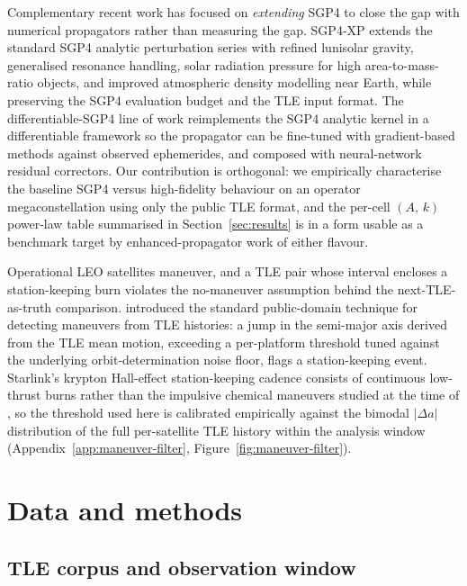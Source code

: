 \documentclass[10pt, letterpaper]{article}
\begin{document}
Complementary recent work has focused on \emph{extending} SGP4 to
close the gap with numerical propagators rather than measuring the
gap. SGP4-XP \citep{payne_sgp4xp_2022} extends the standard SGP4
analytic perturbation series with refined lunisolar gravity,
generalised resonance handling, solar radiation pressure for
high area-to-mass-ratio objects, and improved atmospheric density
modelling near Earth, while preserving the SGP4 evaluation budget
and the TLE input format. The differentiable-SGP4 line of work
\citep{acciarini_dsgp4_2025} reimplements the SGP4 analytic kernel
in a differentiable framework so the propagator can be fine-tuned
with gradient-based methods against observed ephemerides, and
composed with neural-network residual correctors. Our contribution
is orthogonal: we empirically characterise the baseline SGP4
versus high-fidelity behaviour on an operator megaconstellation
using only the public TLE format, and the per-cell
$(A,\,k)$ power-law table summarised in
Section~\ref{sec:results} is in a form usable as a benchmark
target by enhanced-propagator work of either flavour.

Operational LEO satellites maneuver, and a TLE pair whose interval
encloses a station-keeping burn violates the no-maneuver assumption
behind the next-TLE-as-truth comparison. \citet{lemmens2014}
introduced the standard public-domain technique for detecting
maneuvers from TLE histories: a jump in the semi-major axis derived
from the TLE mean motion, exceeding a per-platform threshold tuned
against the underlying orbit-determination noise floor, flags a
station-keeping event. Starlink's krypton Hall-effect station-keeping
cadence consists of continuous low-thrust burns rather than the
impulsive chemical maneuvers studied at the time of
\citet{lemmens2014}, so the threshold used here is calibrated
empirically against the bimodal $|\Delta a|$ distribution of the full
per-satellite TLE history within the analysis window
(Appendix~\ref{app:maneuver-filter},
Figure~\ref{fig:maneuver-filter}).

\section{Data and methods}
\label{sec:methods}

\subsection{TLE corpus and observation window}
\label{sec:methods-corpus}
\end{document}
